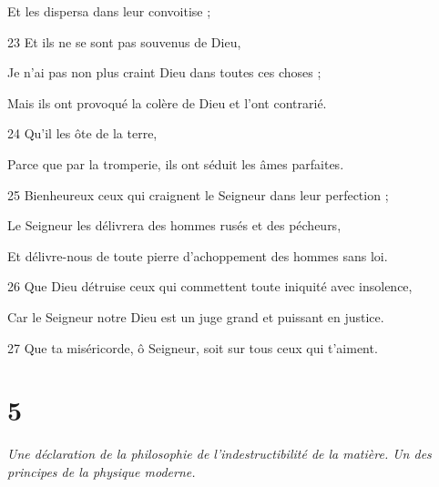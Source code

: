 \par     Et les dispersa dans leur convoitise ;
\par 23 Et ils ne se sont pas souvenus de Dieu,
\par     Je n’ai pas non plus craint Dieu dans toutes ces choses ;
\par     Mais ils ont provoqué la colère de Dieu et l'ont contrarié.
\par 24 Qu'il les ôte de la terre,
\par     Parce que par la tromperie, ils ont séduit les âmes parfaites.
\par   
\par 25 Bienheureux ceux qui craignent le Seigneur dans leur perfection ;
\par     Le Seigneur les délivrera des hommes rusés et des pécheurs,
\par     Et délivre-nous de toute pierre d'achoppement des hommes sans loi.
\par 26 Que Dieu détruise ceux qui commettent toute iniquité avec insolence,
\par     Car le Seigneur notre Dieu est un juge grand et puissant en justice.
\par   
\par 27 Que ta miséricorde, ô Seigneur, soit sur tous ceux qui t'aiment.

\chapter{5}

\par \textit{Une déclaration de la philosophie de l'indestructibilité de la matière. Un des principes de la physique moderne.}

